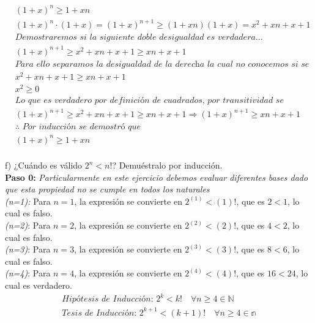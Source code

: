 \documentclass{article}
\begin{document}
\begin{align*}
&(1+x)^n \geq 1 + xn \\
&(1+x)^n \cdot (1+x) = (1+x)^{n+1} \geq (1 + xn)(1+x) = x^2 + xn + x + 1 \\
&\textit{Demostraremos si la siguiente doble desigualdad es verdadera...} \\
&(1+x)^{n+1} \geq x^2 + xn + x + 1 \geq xn + x + 1 \\
&\textit{Para ello separamos la desigualdad de la derecha la cual no conocemos si se cumpla} \\
&x^2 + xn + x + 1 \geq xn + x + 1 \\
&x^2 \geq 0 \\
&\textit{Lo que es verdadero por definición de cuadrados, por transitividad se infiere...} \\
&(1+x)^{n+1} \geq x^2 + xn + x + 1 \geq xn + x + 1 \Rightarrow (1+x)^{n+1} \geq xn + x + 1 \\
&\therefore \textit{ Por inducción se demostró que } \\
& (1+x)^n \geq 1 + xn\\
\end{align*}

  f) ¿Cuándo es válido \(2^n<n!\)? Demuéstralo por inducción. \\
  
\textbf{Paso 0: } \textit{Particularmente en este ejercicio debemos evaluar diferentes bases dado que esta propiedad no se cumple en todos los naturales}
{}\\
\indent \textit{(n=1):}
Para \(n = 1\), la expresión se convierte en \(2^(1)<(1)!\), que es \(2<1\), lo cual es falso. \\

\textit{(n=2)}:
Para \(n = 2\), la expresión se convierte en \(2^(2)<(2)!\), que es \(4<2\), lo cual es falso. \\

\textit{(n=3)}:
Para \(n = 3\), la expresión se convierte en \(2^(3)<(3)!\), que es \(8<6\), lo cual es falso. \\

\textit{(n=4)}:
Para \(n = 4\), la expresión se convierte en \(2^(4)<(4)!\), que es \(16<24\), lo cual es verdadero. \\
  
\begin{align*}
\textit{Hipótesis de Inducción:  } 2^k<k! \quad \forall n \geq 4 \in \mathbb{N}\\
\textit{Tesis de Inducción:  } 2^{k+1}<(k+1)! \quad \forall n \geq 4 \in \mathbb{n}
\end{align*}
\end{document}
